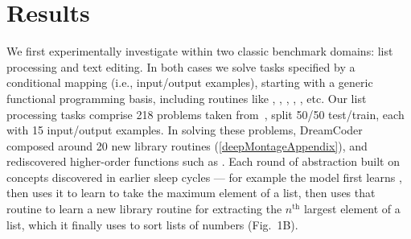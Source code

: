 \documentclass[12pt]{article}
\begin{document}
\section*{Results}
We first experimentally investigate \system within two classic benchmark domains: list
processing and text editing. In both cases we solve tasks specified by
a conditional mapping (i.e., input/output examples), starting with a
generic functional programming basis, including routines like
, , , , , etc.
Our list processing tasks comprise 218 problems taken from~\cite{ecc}, split 50/50 test/train,
each with 15 input/output examples.
In solving these problems, DreamCoder composed around 20 new library routines (\ref{deepMontageAppendix}), and rediscovered
higher-order functions such as . Each round of abstraction built on
concepts discovered in earlier sleep cycles --- for example the
model first learns , then uses
it to learn to take the maximum element of a list, then
uses that routine to learn a new library routine for extracting the
$n^{\text{th}}$ largest element of a list, which it finally uses to
sort lists of numbers (Fig.~1B).
\end{document}
